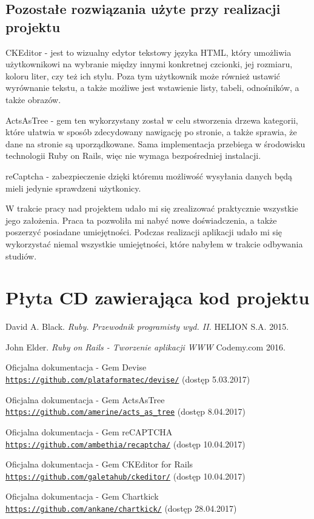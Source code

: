 \documentclass[brudnopis]{xmgr}
\begin{document}
\section{Pozostałe rozwiązania użyte przy realizacji projektu}

CKEditor - jest to wizualny edytor tekstowy języka HTML, który umożliwia użytkownikowi na wybranie między innymi konkretnej 
czcionki, jej rozmiaru, koloru liter, czy też ich stylu. Poza tym użytkownik może również ustawić wyrównanie tekstu,
a także możliwe jest wstawienie listy, tabeli, odnośników, a także obrazów.

ActsAsTree - gem ten wykorzystany został w celu stworzenia drzewa kategorii, które ułatwia w sposób zdecydowany nawigację
po stronie, a także sprawia, że dane na stronie są uporządkowane. Sama implementacja przebiega w środowisku
technologii Ruby on Rails, więc nie wymaga bezpośredniej instalacji.

reCaptcha - zabezpieczenie dzięki któremu możliwość wysyłania danych będą mieli jedynie sprawdzeni użytkonicy.

\summary
W trakcie pracy nad projektem udało mi się zrealizować praktycznie wszystkie jego założenia. Praca ta pozwoliła mi nabyć nowe doświadczenia, a także poszerzyć posiadane umiejętności. Podczas realizacji aplikacji udało mi się wykorzystać niemal wszystkie umiejętności, które nabyłem w trakcie odbywania studiów.

\appendix
\chapter{Płyta CD zawierająca kod projektu}

\begin{thebibliography}{9}

David A. Black.
\textit{Ruby. Przewodnik programisty wyd. II.}
HELION S.A. 2015.

John Elder.
\textit{Ruby on Rails - Tworzenie aplikacji WWW}
Codemy.com 2016.

Oficjalna dokumentacja - Gem Devise
\\\texttt{\url{https://github.com/plataformatec/devise/}} (dostęp 5.03.2017)

Oficjalna dokumentacja - Gem ActsAsTree
\\\texttt{\url{https://github.com/amerine/acts_as_tree}} (dostęp 8.04.2017)

Oficjalna dokumentacja - Gem reCAPTCHA
\\\texttt{\url{https://github.com/ambethia/recaptcha/}} (dostęp 10.04.2017)

Oficjalna dokumentacja - Gem CKEditor for Rails
\\\texttt{\url{https://github.com/galetahub/ckeditor/}} (dostęp 10.04.2017)

Oficjalna dokumentacja - Gem Chartkick
\\\texttt{\url{https://github.com/ankane/chartkick/}} (dostęp 28.04.2017)

\end{thebibliography} 


\oswiadczenie
\end{document}
